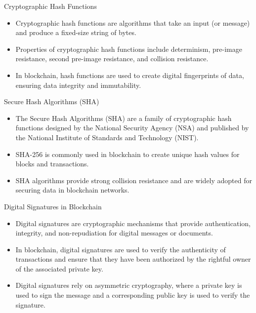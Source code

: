\begin{withoutheadline}
\begin{frame}{Cryptographic Hash Functions}
    \begin{itemize}
        \item Cryptographic hash functions are algorithms that take an input (or message) and produce a fixed-size string of bytes.
        \item Properties of cryptographic hash functions include determinism, pre-image resistance, second pre-image resistance, and collision resistance.
        \item In blockchain, hash functions are used to create digital fingerprints of data, ensuring data integrity and immutability.
    \end{itemize}
\end{frame}

\begin{frame}{Secure Hash Algorithms (SHA)}
    \begin{itemize}
        \item The Secure Hash Algorithms (SHA) are a family of cryptographic hash functions designed by the National Security Agency (NSA) and published by the National Institute of Standards and Technology (NIST).
        \item SHA-256 is commonly used in blockchain to create unique hash values for blocks and transactions.
        \item SHA algorithms provide strong collision resistance and are widely adopted for securing data in blockchain networks.
    \end{itemize}
\end{frame}

\begin{frame}{Digital Signatures in Blockchain}
    \begin{itemize}
        \item Digital signatures are cryptographic mechanisms that provide authentication, integrity, and non-repudiation for digital messages or documents.
        \item In blockchain, digital signatures are used to verify the authenticity of transactions and ensure that they have been authorized by the rightful owner of the associated private key.
        \item Digital signatures rely on asymmetric cryptography, where a private key is used to sign the message and a corresponding public key is used to verify the signature.
    \end{itemize}
\end{frame}


\end{withoutheadline}
